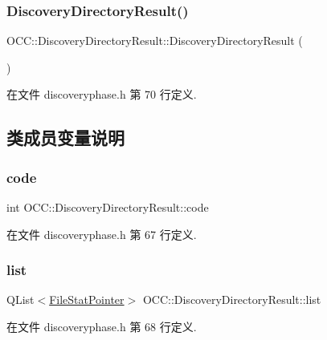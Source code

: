 \subsubsection{\texorpdfstring{Discovery\+Directory\+Result()}{DiscoveryDirectoryResult()}}
{\footnotesize\ttfamily O\+C\+C\+::\+Discovery\+Directory\+Result\+::\+Discovery\+Directory\+Result (\begin{DoxyParamCaption}{ }\end{DoxyParamCaption})}



在文件 discoveryphase.\+h 第 70 行定义.



\subsection{类成员变量说明}
\mbox{\label{struct_o_c_c_1_1_discovery_directory_result_ab45e45d64ce61660b538a779222c4166}} 
\subsubsection{\texorpdfstring{code}{code}}
{\footnotesize\ttfamily int O\+C\+C\+::\+Discovery\+Directory\+Result\+::code}



在文件 discoveryphase.\+h 第 67 行定义.

\mbox{\label{struct_o_c_c_1_1_discovery_directory_result_a5f83484aa39a7f209434f5ca67e90e01}} 
\subsubsection{\texorpdfstring{list}{list}}
{\footnotesize\ttfamily Q\+List$<$\hyperlink{class_o_c_c_1_1_file_stat_pointer}{File\+Stat\+Pointer}$>$ O\+C\+C\+::\+Discovery\+Directory\+Result\+::list}



在文件 discoveryphase.\+h 第 68 行定义.

